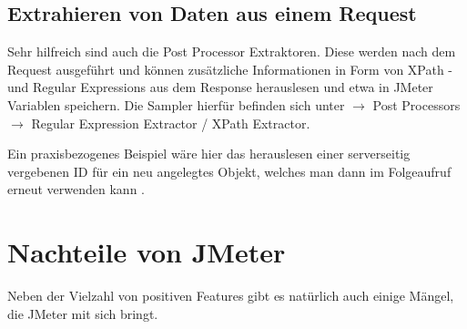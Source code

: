 \documentclass[a4paper,12pt]{article}
\begin{document}
\subsection{Extrahieren von Daten aus einem Request}
Sehr hilfreich sind auch die Post Processor Extraktoren. Diese werden nach dem Request ausgeführt und können zusätzliche Informationen in Form von XPath -und Regular Expressions aus dem Response herauslesen und etwa in JMeter Variablen speichern. Die Sampler hierfür befinden sich unter $\rightarrow$ Post Processors $\rightarrow$ Regular Expression Extractor / XPath Extractor.

Ein praxisbezogenes Beispiel wäre hier das herauslesen einer serverseitig vergebenen ID für ein neu angelegtes Objekt, welches man dann im Folgeaufruf erneut verwenden kann \cite{online:lasttestjmeter}.   

\section{Nachteile von JMeter}
Neben der Vielzahl von positiven Features gibt es natürlich auch einige Mängel, die JMeter mit sich bringt.
\end{document}
